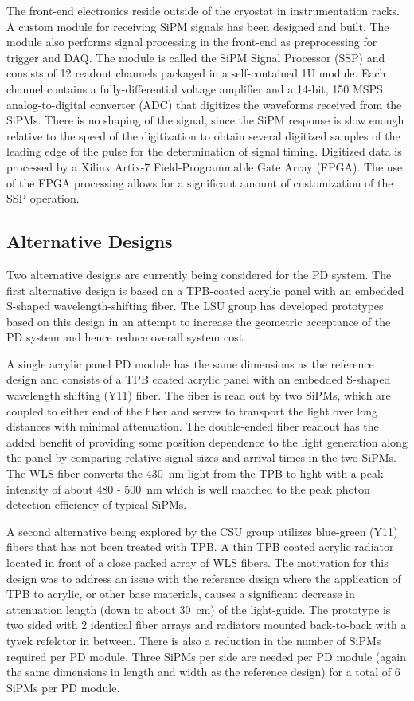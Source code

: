 The front-end electronics reside outside of the cryostat in
instrumentation racks. A custom module for receiving SiPM signals has
been designed and built. The module also performs signal processing in
the front-end as preprocessing for trigger and DAQ.  The module is
called the SiPM Signal Processor (SSP) and consists of 12 readout
channels packaged in a self-contained 1U module.  Each channel
contains a fully-differential voltage amplifier and a 14-bit, 150 MSPS
analog-to-digital converter (ADC) that digitizes the waveforms
received from the SiPMs. There is no shaping of the signal, since the
SiPM response is slow enough relative to the speed of the digitization
to obtain several digitized samples of the leading edge of the pulse
for the determination of signal timing. Digitized data is processed by
a Xilinx Artix-7 Field-Programmable Gate Array (FPGA).  The use of the
FPGA processing allows for a significant amount of customization of
the SSP operation. 

\subsection{Alternative Designs} 

Two alternative designs are currently being considered for the PD
system. The first alternative design is based on a TPB-coated acrylic
panel with an embedded S-shaped wavelength-shifting fiber. The LSU
group has developed prototypes based on this design in an attempt to
increase the geometric acceptance of the PD system and hence reduce
overall system cost. 

A single acrylic panel PD module has the same dimensions as the
reference design and consists of a TPB coated acrylic panel with an
embedded S-shaped wavelength shifting (Y11) fiber. The fiber is read
out by two SiPMs, which are coupled to either end of the fiber and
serves to transport the light over long distances with minimal
attenuation. The double-ended fiber readout has the added benefit of
providing some position dependence to the light generation along the
panel by comparing relative signal sizes and arrival times in the two
SiPMs. The WLS fiber converts the 430~nm light from the TPB to light
with a peak intensity of about 480 - 500~nm which is well matched to
the peak photon detection efficiency of typical SiPMs.

A second alternative being explored by the CSU group utilizes
blue-green (Y11) fibers that has not been treated with TPB. A thin TPB
coated acrylic radiator located in front of a close packed array of
WLS fibers. The motivation for this design was to address an issue
with the reference design where the application of TPB to acrylic, or
other base materials, causes a significant decrease in attenuation
length (down to about 30~cm) of the light-guide. The prototype is two
sided with 2 identical fiber arrays and radiators mounted back-to-back
with a tyvek refelctor in between. There is also a reduction in the
number of SiPMs required per PD module. Three SiPMs per side are
needed per PD module (again the same dimensions in length and width as
the reference design) for a total of 6 SiPMs per PD module.

